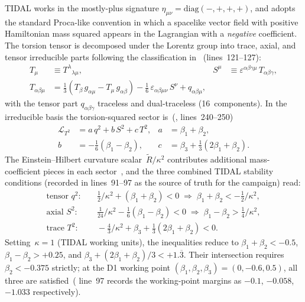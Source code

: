 TIDAL works in the mostly-plus signature $\eta_{\mu\nu} = \mathrm{diag}(-,+,+,+)$,
and adopts the standard Proca-like convention in which a spacelike vector field
with positive Hamiltonian mass squared appears in the Lagrangian with a
\emph{negative} coefficient.  The torsion tensor is decomposed under the Lorentz
group into trace, axial, and tensor irreducible parts following the
classification in~
(lines~121--127):
\begin{align}
  T_\mu &\equiv T^\lambda{}_{\lambda\mu}, &
  S^\mu &\equiv \varepsilon^{\alpha\beta\gamma\mu}\, T_{\alpha\beta\gamma},
  \nonumber \\
  T_{\alpha\beta\mu}
  &= \tfrac{1}{3}(T_\beta\, g_{\alpha\mu} - T_\mu\, g_{\alpha\beta})
  -  \tfrac{1}{6}\,\varepsilon_{\alpha\beta\mu\nu}\, S^\nu
  +  q_{\alpha\beta\mu},
  \label{eq:torsion-irreducible}
\end{align}
with the tensor part $q_{\alpha\beta\gamma}$ traceless and dual-traceless
(16~components).  In the irreducible basis the torsion-squared sector
is~(, lines~240--250)
\begin{align}
  \mathcal{L}_{T^2}
  &= a\, q^2 + b\, S^2 + c\, T^2, &
  a &= \beta_1 + \beta_2, \nonumber \\
  b &= -\tfrac{1}{6}(\beta_1 - \beta_2), &
  c &= \beta_3 + \tfrac{1}{3}(2\beta_1 + \beta_2).
  \label{eq:irreducible-basis}
\end{align}
The Einstein--Hilbert curvature scalar~$\tilde{R}/\kappa^2$ contributes additional
mass-coefficient pieces in each sector~\cite{hayashi1979new}, and the three
combined TIDAL stability conditions (recorded in
 lines~91--97 as
the source of truth for the campaign) read:
\begin{align}
  \text{tensor } q^2 :& \quad
    \tfrac{1}{2}/\kappa^2 + (\beta_1 + \beta_2) < 0
    \;\Rightarrow\; \beta_1 + \beta_2 < -\tfrac{1}{2}/\kappa^2,
  \label{eq:tidal-tensor} \\
  \text{axial } S^2 :& \quad
    \tfrac{1}{24}/\kappa^2 - \tfrac{1}{6}(\beta_1 - \beta_2) < 0
    \;\Rightarrow\; \beta_1 - \beta_2 > \tfrac{1}{4}/\kappa^2,
  \label{eq:tidal-axial} \\
  \text{trace } T^2 :& \quad
    -\tfrac{4}{3}/\kappa^2 + \beta_3 + \tfrac{1}{3}(2\beta_1 + \beta_2) < 0.
  \label{eq:tidal-trace}
\end{align}
Setting~$\kappa = 1$ (TIDAL working units), the inequalities reduce to
$\beta_1+\beta_2 < -0.5$, $\beta_1-\beta_2 > +0.25$, and
$\beta_3 + (2\beta_1 + \beta_2)/3 < +1.\overline{3}$.  Their intersection
requires $\beta_2 < -0.375$ strictly; at the D1 working point
$(\beta_1,\beta_2,\beta_3) = (0, -0.6, 0.5)$, all three are
satisfied~( line~97 records the working-point
margins as $-0.1$, $-0.058$, $-1.033$ respectively).

